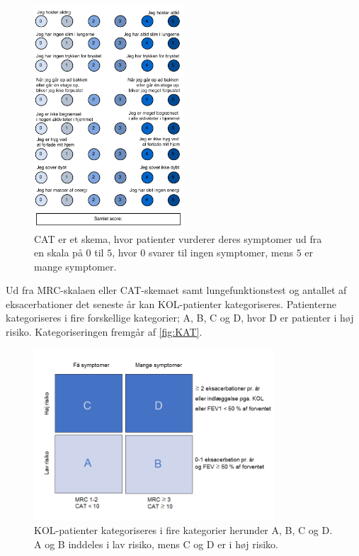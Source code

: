 \begin{figure} [H]
\centering
\includegraphics[width=0.5\textwidth]{figures/CAT}
\caption{CAT er et skema, hvor patienter vurderer deres symptomer ud fra en skala på $0$ til $5$, hvor $0$ svarer til ingen symptomer, mens $5$ er mange symptomer.}
\label{fig:CAT}
\end{figure} 

\noindent
Ud fra MRC-skalaen eller CAT-skemaet samt lungefunktionstest og antallet af eksacerbationer det seneste år kan KOL-patienter kategoriseres. Patienterne kategoriseres i fire forskellige kategorier; A, B, C og D, hvor D er patienter i høj risiko. Kategoriseringen fremgår af \autoref{fig:KAT}.

\begin{figure} [H]
\centering
\includegraphics[width=0.8\textwidth]{figures/KAT}
\caption{KOL-patienter kategoriseres i fire kategorier herunder A, B, C og D. A og B inddeles i lav risiko, mens C og D er i høj risiko.}
\label{fig:KAT}
\end{figure} 
 
